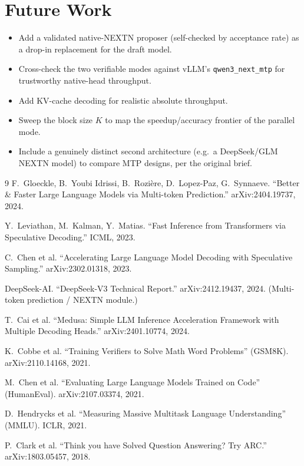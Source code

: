 \documentclass[11pt]{article}
\begin{document}
\section{Future Work}
\begin{itemize}[nosep]
  \item Add a validated native-NEXTN proposer (self-checked by acceptance rate)
        as a drop-in replacement for the draft model.
  \item Cross-check the two verifiable modes against vLLM's
        \texttt{qwen3\_next\_mtp} for trustworthy native-head throughput.
  \item Add KV-cache decoding for realistic absolute throughput.
  \item Sweep the block size $K$ to map the speedup/accuracy frontier of the
        parallel mode.
  \item Include a genuinely distinct second architecture (e.g.\ a DeepSeek/GLM
        NEXTN model) to compare MTP designs, per the original brief.
\end{itemize}

\begin{thebibliography}{9}
 F.~Gloeckle, B.~Youbi Idrissi, B.~Rozi\`ere, D.~Lopez-Paz, G.~Synnaeve.
``Better \& Faster Large Language Models via Multi-token Prediction.'' arXiv:2404.19737, 2024.

 Y.~Leviathan, M.~Kalman, Y.~Matias.
``Fast Inference from Transformers via Speculative Decoding.'' ICML, 2023.

 C.~Chen et al.
``Accelerating Large Language Model Decoding with Speculative Sampling.'' arXiv:2302.01318, 2023.

 DeepSeek-AI.
``DeepSeek-V3 Technical Report.'' arXiv:2412.19437, 2024. (Multi-token prediction / NEXTN module.)

 T.~Cai et al.
``Medusa: Simple LLM Inference Acceleration Framework with Multiple Decoding Heads.'' arXiv:2401.10774, 2024.

 K.~Cobbe et al.
``Training Verifiers to Solve Math Word Problems'' (GSM8K). arXiv:2110.14168, 2021.

 M.~Chen et al.
``Evaluating Large Language Models Trained on Code'' (HumanEval). arXiv:2107.03374, 2021.

 D.~Hendrycks et al.
``Measuring Massive Multitask Language Understanding'' (MMLU). ICLR, 2021.

 P.~Clark et al.
``Think you have Solved Question Answering? Try ARC.'' arXiv:1803.05457, 2018.
\end{thebibliography}
\end{document}
